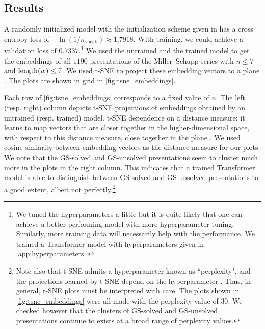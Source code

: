 \subsection{Results}\label{sec:transformer_results}

A randomly initialized model with the initialization scheme given in \cite{Radford2019LanguageMA} has a cross entropy loss of
$-\ln (1/n_{\text{vocab}}) \approx 1.7918$.
With training, we could achieve a validation loss of $0.7337$.\footnote{
We tuned the hyperparameters a little but it is quite likely that one can achieve a better performing model with more hyperparameter tuning.
Similarly, more training data will necessarily help with the performance.
We trained a Transformer model with hyperparameters given in \autoref{app:hyperparameters}.}
We used the untrained and the trained model to get the embeddings of all $1190$ presentations of the Miller--Schupp series with $n \leq 7$ and $\operatorname{length}(w) \leq 7$.
We used t-SNE to project these embedding vectors to a plane \cite{JMLR:v9:vandermaaten08a}.
The plots are shown in grid in \autoref{fig:tsne_embeddings}.

Each row of \autoref{fig:tsne_embeddings} corresponds to a fixed value of $n$.
The left (resp. right) column depicts t-SNE projections of embeddings obtained by an untrained (resp. trained) model.
t-SNE dependence on a distance measure: it learns to map vectors that are closer together in the higher-dimensional space, with respect to this distance measure, close together in the plane \cite{JMLR:v9:vandermaaten08a}.
We used cosine simiarity between embedding vectors as the distance measure for our plots.
We note that the GS-solved and GS-unsolved presentations seem to cluster much more in the plots in the right column.
This indicates that a trained Transformer model is able to distinguish between GS-solved and GS-unsolved presentations to a good extent, albeit not perfectly.\footnote{
Note also that t-SNE admits a hyperparameter known as ``perplexity", and the projections learned by t-SNE depend on the hyperparameter \cite{wattenberg2016how}.
Thus, in general, t-SNE plots must be interpreted with care.
The plots shown in \autoref{fig:tsne_embeddings} were all made with the perplexity value of $30$.
We checked however that the clusters of GS-solved and GS-unsolved presentations continue to exists at a broad range of perplexity values.}

